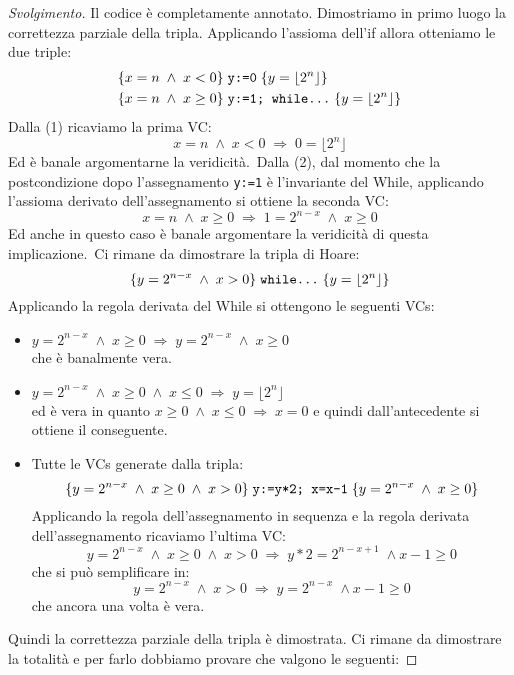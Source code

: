 \documentclass[a4paper, 10pt]{article} %
\begin{document}
\begin{proof}[Svolgimento]
Il codice è completamente annotato. Dimostriamo in primo luogo la correttezza parziale della tripla. Applicando l'assioma dell'if allora otteniamo le due triple:
\begin{align}
& \{x=n \; \land \; x<0 \} \; \text{\texttt{y:=0}} \; \{y= \lfloor 2^n \rfloor \} \\
& \{x=n \; \land \; x \geq 0 \} \; \text{\texttt{y:=1; while}} \texttt{\dots } \; \{ y= \lfloor 2^n \rfloor \}
\end{align}
Dalla (1) ricaviamo la prima VC:
$$ x = n \; \land \; x<0 \; \Rightarrow \; 0 = \lfloor 2^n \rfloor $$
Ed è banale argomentarne la veridicità.\
Dalla (2), dal momento che la postcondizione dopo l'assegnamento \texttt{y:=1} è l'invariante del While, applicando l'assioma derivato dell'assegnamento si ottiene la seconda VC:
$$ x=n \; \land \; x \geq 0 \; \Rightarrow \; 1 = 2^{n-x} \; \land \; x \geq 0 $$
Ed anche in questo caso è banale argomentare la veridicità di questa implicazione.\
Ci rimane da dimostrare la tripla di Hoare:
$$ \{ y=2^{n-x} \; \land \; x>0 \} \; \text{\texttt{while}} \texttt{\dots } \; \{y= \lfloor 2^n \rfloor \} $$
Applicando la regola derivata del While si ottengono le seguenti VCs:
\begin{itemize}
	\item $ y=2^{n-x} \; \land \; x \geq 0 \; \Rightarrow \; y=2^{n-x} \; \land \; x \geq 0 $ \\
		  che è banalmente vera.
	\item $ y=2^{n-x} \; \land \; x \geq 0 \; \land \; x \leq 0 \; \Rightarrow \; y = \lfloor 2^n \rfloor $ \\
		  ed è vera in quanto $ x \geq 0 \; \land \; x \leq 0 \; \Rightarrow \; x = 0 $ e quindi
		  dall'antecedente si ottiene il conseguente.
	\item Tutte le VCs generate dalla tripla:
		  $$ \{y=2^{n-x} \; \land \; x \geq 0 \; \land \; x>0 \} \; 
		     \text{\texttt{y:=y*2; x=x-1}} 
		     \; \{y=2^{n-x} \; \land \; x \geq 0 \} $$
		  Applicando la regola dell'assegnamento in sequenza e la regola derivata dell'assegnamento ricaviamo
		  l'ultima VC:
		  $$ y=2^{n-x} \; \land \;  x \geq 0 \; \land \; x>0 \; 
		  	 \Rightarrow 
		  	 \; y*2 = 2^{n-x+1} \; \land x-1 \geq 0 $$
		  che si può semplificare in:
		  $$ y=2^{n-x} \; \land \; x>0 \; 
		  	 \Rightarrow 
		  	 \; y = 2^{n-x} \; \land x-1 \geq 0 $$
		  che ancora una volta è vera.
\end{itemize}
Quindi la correttezza parziale della tripla è dimostrata. Ci rimane da dimostrare la totalità e per farlo dobbiamo provare che valgono le seguenti:

\end{proof}
\end{document}
